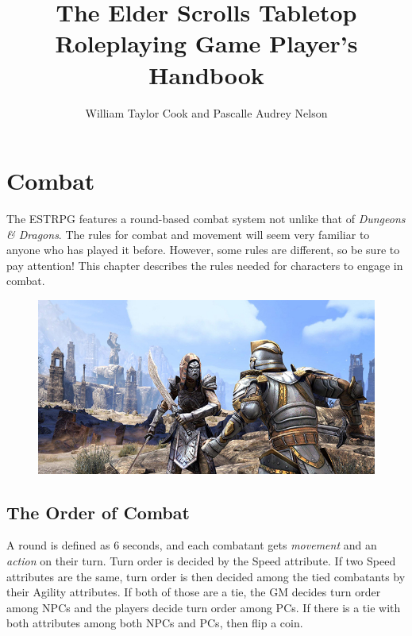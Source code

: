 \documentclass[12pt]{book}
\title{The Elder Scrolls Tabletop Roleplaying Game Player's Handbook}
\author{William Taylor Cook and Pascalle Audrey Nelson}
\begin{document}
\maketitle



\tableofcontents






\chapter{Combat}

The ESTRPG features a round-based combat system not unlike that of \textit{Dungeons \& Dragons}. The rules for combat and movement will seem very familiar to anyone who has played it before. However, some rules are different, so be sure to pay attention! This chapter describes the rules needed for characters to engage in combat.

\begin{figure}[H]
	\includegraphics[width=\textwidth]{combat.png}
\end{figure}

\section{The Order of Combat}

A round is defined as 6 seconds, and each combatant gets \textit{movement} and an \textit{action} on their turn. Turn order is decided by the Speed attribute. If two Speed attributes are the same, turn order is then decided among the tied combatants by their Agility attributes. If both of those are a tie, the GM decides turn order among NPCs and the players decide turn order among PCs. If there is a tie with both attributes among both NPCs and PCs, then flip a coin.
\end{document}
